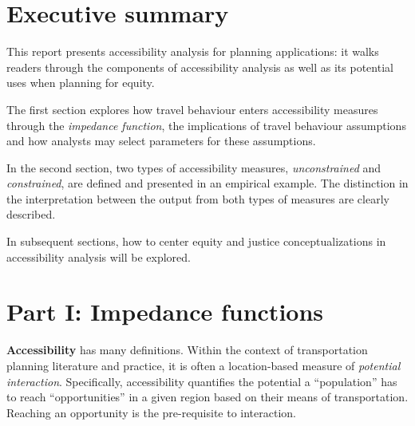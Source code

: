 \documentclass[12pt, oneside]{report}
\begin{document}



\setcounter{tocdepth}{1}
\tableofcontents
\restoregeometry

\newpage\ifdefined\Shaded\renewenvironment{Shaded}{\begin{tcolorbox}[interior hidden, breakable, boxrule=0pt, frame hidden, borderline west={3pt}{0pt}{shadecolor}, sharp corners, enhanced]}{\end{tcolorbox}}\fi

\hypertarget{executive-summary}{%
\section{Executive summary}\label{executive-summary}}

This report presents accessibility analysis for planning applications:
it walks readers through the components of accessibility analysis as
well as its potential uses when planning for equity.

The first section explores how travel behaviour enters accessibility
measures through the \emph{impedance function}, the implications of
travel behaviour assumptions and how analysts may select parameters for
these assumptions.

In the second section, two types of accessibility measures,
\emph{unconstrained} and \emph{constrained}, are defined and presented
in an empirical example. The distinction in the interpretation between
the output from both types of measures are clearly described.

In subsequent sections, how to center equity and justice
conceptualizations in accessibility analysis will be explored.

\newpage

\hypertarget{sec-partI}{%
\section{Part I: Impedance functions}\label{sec-partI}}

\textbf{Accessibility} has many definitions. Within the context of
transportation planning literature and practice, it is often a
location-based measure of \emph{potential interaction}. Specifically,
accessibility quantifies the potential a ``population'' has to reach
``opportunities'' in a given region based on their means of
transportation. Reaching an opportunity is the pre-requisite to
interaction.
\end{document}
